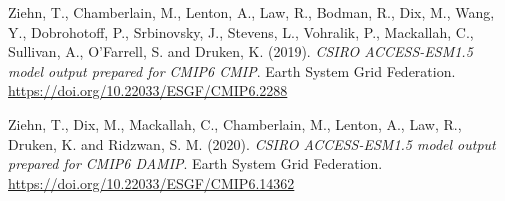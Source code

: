 \documentclass[12pt,oneside,a4paper]{reedthesis}
\newlength{\cslhangindent}
\newenvironment{CSLReferences}[2] %
 {%
  \setlength{\parindent}{0pt}
  \ifodd #1 \everypar{\setlength{\hangindent}{\cslhangindent}}\ignorespaces\fi
  \ifnum #2 > 0
  \setlength{\parskip}{#2\baselineskip}
  \fi
 }%
 {}
\begin{document}
\begin{CSLReferences}{1}{0}
\leavevmode{}%
Ziehn, T., Chamberlain, M., Lenton, A., Law, R., Bodman, R., Dix, M., Wang, Y., Dobrohotoff, P., Srbinovsky, J., Stevens, L., Vohralik, P., Mackallah, C., Sullivan, A., O'Farrell, S. and Druken, K. (2019). \emph{CSIRO ACCESS-ESM1.5 model output prepared for CMIP6 CMIP}. Earth System Grid Federation. \url{https://doi.org/10.22033/ESGF/CMIP6.2288}

\leavevmode{}%
Ziehn, T., Dix, M., Mackallah, C., Chamberlain, M., Lenton, A., Law, R., Druken, K. and Ridzwan, S. M. (2020). \emph{CSIRO ACCESS-ESM1.5 model output prepared for CMIP6 DAMIP}. Earth System Grid Federation. \url{https://doi.org/10.22033/ESGF/CMIP6.14362}

\end{CSLReferences}


\end{document}

